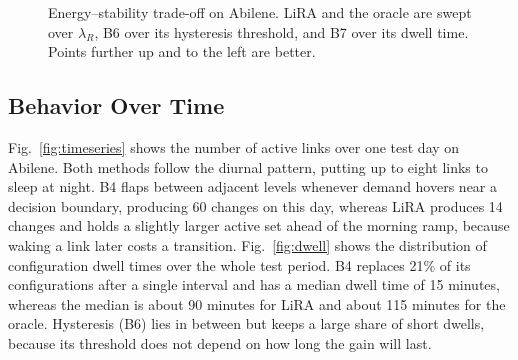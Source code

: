 \documentclass[journal]{IEEEtran}
\begin{document}
\begin{figure}[t]
\centering
{}
\caption{Energy--stability trade-off on Abilene. LiRA and the oracle are swept over $\lambda_R$, B6 over its hysteresis threshold, and B7 over its dwell time. Points further up and to the left are better.}
\label{fig:pareto}
\end{figure}

\subsection{Behavior Over Time}

Fig.~\ref{fig:timeseries} shows the number of active links over one test day on Abilene. Both methods follow the diurnal pattern, putting up to eight links to sleep at night. B4 flaps between adjacent levels whenever demand hovers near a decision boundary, producing 60 changes on this day, whereas LiRA produces 14 changes and holds a slightly larger active set ahead of the morning ramp, because waking a link later costs a transition. Fig.~\ref{fig:dwell} shows the distribution of configuration dwell times over the whole test period. B4 replaces 21\% of its configurations after a single interval and has a median dwell time of 15 minutes, whereas the median is about 90 minutes for LiRA and about 115 minutes for the oracle. Hysteresis (B6) lies in between but keeps a large share of short dwells, because its threshold does not depend on how long the gain will last.
\end{document}

